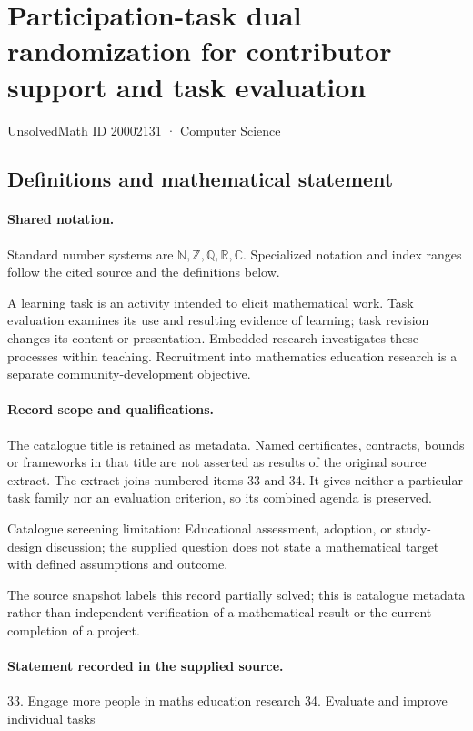 \documentclass[11pt]{article}
\begin{document}
\setcounter{section}{20002130}
\section{Participation-task dual randomization for contributor support and task evaluation}\label{20002131}
{\small\sffamily UnsolvedMath ID 20002131 · Computer Science}
\subsection{Definitions and mathematical statement}

\paragraph{Shared notation.}Standard number systems are $\mathbb N,\mathbb Z,\mathbb Q,\mathbb R,\mathbb C$. Specialized notation and index ranges follow the cited source and the definitions below.


A learning task is an activity intended to elicit mathematical work. Task evaluation examines its use and resulting evidence of learning; task revision changes its content or presentation. Embedded research investigates these processes within teaching. Recruitment into mathematics education research is a separate community-development objective.
\paragraph{Record scope and qualifications.}
The catalogue title is retained as metadata. Named certificates, contracts, bounds or frameworks in that title are not asserted as results of the original source extract.
The extract joins numbered items 33 and 34. It gives neither a particular task family nor an evaluation criterion, so its combined agenda is preserved.

Catalogue screening limitation: Educational assessment, adoption, or study-design discussion; the supplied question does not state a mathematical target with defined assumptions and outcome.

The source snapshot labels this record partially solved; this is catalogue metadata rather than independent verification of a mathematical result or the current completion of a project.
\paragraph{Statement recorded in the supplied source.}
33. Engage more people in maths education research 34. Evaluate and improve individual tasks
\end{document}
